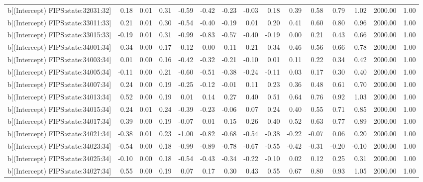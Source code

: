 \begin{table}[ht]
\begin{tabular}{rrrrrrrrrrrrrrr}
  b[(Intercept) FIPS:state:32031:32] & 0.18 & 0.01 & 0.31 & -0.59 & -0.42 & -0.23 & -0.03 & 0.18 & 0.39 & 0.58 & 0.79 & 1.02 & 2000.00 & 1.00 \\ 
  b[(Intercept) FIPS:state:33011:33] & 0.21 & 0.01 & 0.30 & -0.54 & -0.40 & -0.19 & 0.01 & 0.20 & 0.41 & 0.60 & 0.80 & 0.96 & 2000.00 & 1.00 \\ 
  b[(Intercept) FIPS:state:33015:33] & -0.19 & 0.01 & 0.31 & -0.99 & -0.83 & -0.57 & -0.40 & -0.19 & 0.00 & 0.21 & 0.43 & 0.66 & 2000.00 & 1.00 \\ 
  b[(Intercept) FIPS:state:34001:34] & 0.34 & 0.00 & 0.17 & -0.12 & -0.00 & 0.11 & 0.21 & 0.34 & 0.46 & 0.56 & 0.66 & 0.78 & 2000.00 & 1.00 \\ 
  b[(Intercept) FIPS:state:34003:34] & 0.01 & 0.00 & 0.16 & -0.42 & -0.32 & -0.21 & -0.10 & 0.01 & 0.11 & 0.22 & 0.34 & 0.42 & 2000.00 & 1.00 \\ 
  b[(Intercept) FIPS:state:34005:34] & -0.11 & 0.00 & 0.21 & -0.60 & -0.51 & -0.38 & -0.24 & -0.11 & 0.03 & 0.17 & 0.30 & 0.40 & 2000.00 & 1.00 \\ 
  b[(Intercept) FIPS:state:34007:34] & 0.24 & 0.00 & 0.19 & -0.25 & -0.12 & -0.01 & 0.11 & 0.23 & 0.36 & 0.48 & 0.61 & 0.70 & 2000.00 & 1.00 \\ 
  b[(Intercept) FIPS:state:34013:34] & 0.52 & 0.00 & 0.19 & 0.01 & 0.14 & 0.27 & 0.40 & 0.51 & 0.64 & 0.76 & 0.92 & 1.03 & 2000.00 & 1.00 \\ 
  b[(Intercept) FIPS:state:34015:34] & 0.24 & 0.01 & 0.24 & -0.39 & -0.23 & -0.06 & 0.07 & 0.24 & 0.40 & 0.55 & 0.71 & 0.85 & 2000.00 & 1.00 \\ 
  b[(Intercept) FIPS:state:34017:34] & 0.39 & 0.00 & 0.19 & -0.07 & 0.01 & 0.15 & 0.26 & 0.40 & 0.52 & 0.63 & 0.77 & 0.89 & 2000.00 & 1.00 \\ 
  b[(Intercept) FIPS:state:34021:34] & -0.38 & 0.01 & 0.23 & -1.00 & -0.82 & -0.68 & -0.54 & -0.38 & -0.22 & -0.07 & 0.06 & 0.20 & 2000.00 & 1.00 \\ 
  b[(Intercept) FIPS:state:34023:34] & -0.54 & 0.00 & 0.18 & -0.99 & -0.89 & -0.78 & -0.67 & -0.55 & -0.42 & -0.31 & -0.20 & -0.10 & 2000.00 & 1.00 \\ 
  b[(Intercept) FIPS:state:34025:34] & -0.10 & 0.00 & 0.18 & -0.54 & -0.43 & -0.34 & -0.22 & -0.10 & 0.02 & 0.12 & 0.25 & 0.31 & 2000.00 & 1.00 \\ 
  b[(Intercept) FIPS:state:34027:34] & 0.55 & 0.00 & 0.19 & 0.07 & 0.17 & 0.30 & 0.43 & 0.55 & 0.67 & 0.80 & 0.93 & 1.05 & 2000.00 & 1.00 \\ 

\end{tabular}
\end{table}

